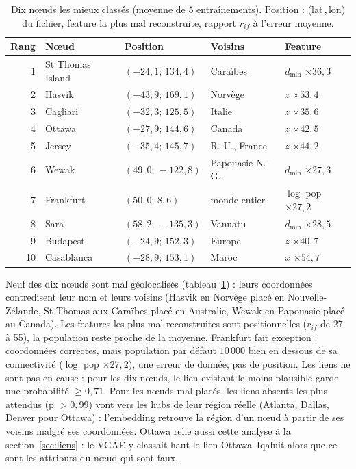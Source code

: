 \begin{table}[h]
\centering
\footnotesize
\caption{Dix nœuds les mieux classés (moyenne de 5 entraînements). Position :
(lat\,,\,lon) du fichier, feature la plus mal reconstruite, rapport $r_{if}$ à
l'erreur moyenne.}
\label{tab:nodes}
\setlength{\tabcolsep}{3pt}
\begin{tabular}{@{}rllll@{}}
\toprule
Rang & Nœud & Position & Voisins & Feature \\
\midrule
1 & St Thomas Island & $(-24{,}1;\,134{,}4)$ & Caraïbes & $d_{\min}$ $\times36{,}3$ \\
2 & Hasvik & $(-43{,}9;\,169{,}1)$ & Norvège & $z$ $\times53{,}4$ \\
3 & Cagliari & $(-32{,}3;\,125{,}5)$ & Italie & $z$ $\times35{,}6$ \\
4 & Ottawa & $(-27{,}9;\,144{,}6)$ & Canada & $z$ $\times42{,}5$ \\
5 & Jersey & $(-35{,}4;\,145{,}7)$ & R.-U., France & $z$ $\times44{,}2$ \\
6 & Wewak & $(49{,}0;\,-122{,}8)$ & Papouasie-N.-G. & $d_{\min}$ $\times27{,}3$ \\
7 & Frankfurt & $(50{,}0;\,8{,}6)$ & monde entier & $\log$ pop $\times27{,}2$ \\
8 & Sara & $(58{,}2;\,-135{,}3)$ & Vanuatu & $d_{\min}$ $\times28{,}5$ \\
9 & Budapest & $(-24{,}9;\,152{,}3)$ & Europe & $z$ $\times40{,}7$ \\
10 & Casablanca & $(-28{,}9;\,153{,}1)$ & Maroc & $x$ $\times54{,}7$ \\
\bottomrule
\end{tabular}
\end{table}

Neuf des dix nœuds sont mal géolocalisés (tableau~\ref{tab:nodes}) : leurs coordonnées
contredisent leur nom et leurs voisins (Hasvik en Norvège placé en Nouvelle-Zélande,
St Thomas aux Caraïbes placé en Australie, Wewak en Papouasie placé au Canada). Les
features les plus mal reconstruites sont positionnelles ($r_{if}$ de 27 à 55), la
population reste proche de la moyenne. Frankfurt fait exception : coordonnées
correctes, mais population par défaut $10\,000$ bien en dessous de sa connectivité
($\log$ pop $\times27{,}2$), une erreur de donnée, pas de position. Les liens ne
sont pas en cause : pour les dix nœuds, le lien existant le moins plausible garde une
probabilité $\ge0{,}71$. Pour les nœuds mal placés, les liens absents les plus
attendus (p $>0{,}99$) vont vers les hubs de leur région réelle (Atlanta, Dallas,
Denver pour Ottawa) : l'embedding retrouve la région d'un nœud à partir de ses
voisins malgré ses coordonnées. Ottawa relie aussi cette analyse à la
section~\ref{sec:liens} : le VGAE y classait haut le lien Ottawa--Iqaluit alors que
ce sont les attributs du nœud qui sont faux.

